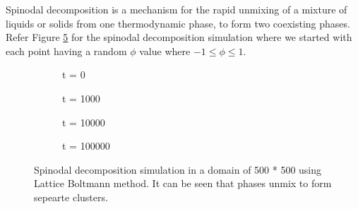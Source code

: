\documentclass{article}
\begin{document}
Spinodal decomposition is a mechanism for the rapid unmixing of a mixture of liquids or solids from one thermodynamic phase, to form two coexisting phases. Refer Figure \ref*{fig:spinod} for the spinodal decomposition simulation where we started with each point having a random $\phi$ value where $ -1 \leq \phi \leq 1.  $
\begin{figure}[h!]
	\centering
	\begin{subfigure}[h!]{4cm}            
		\caption{t = 0}
		\label{Fig:Data1}
	\end{subfigure}
	\begin{subfigure}[h!]{4cm}
		\centering
		\caption{t = 1000}
		\label{Fig:Data2}
	\end{subfigure}
	\begin{subfigure}[h!]{4cm}            
		\caption{t = 10000}
		\label{Fig:Data3}
	\end{subfigure}
	\begin{subfigure}[h!]{4cm}
		\centering
		\caption{t = 100000}
		\label{Fig:Data4}
	\end{subfigure}
	\caption{Spinodal decomposition simulation in a domain of 500 * 500 using Lattice Boltmann method. It can be seen that phases unmix to form sepearte clusters.}\label{fig:spinod}
\end{figure}
\end{document}
